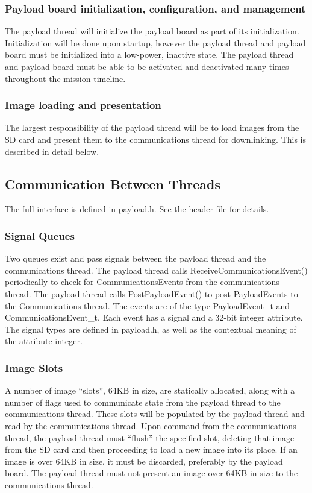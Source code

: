 \documentclass{article}
\begin{document}
\subsubsection{Payload board initialization, configuration, and management}
The payload thread will initialize the payload board as part of its initialization.
Initialization will be done upon startup, however the payload thread and payload
board must be initialized into a low-power, inactive state. The payload thread
and payload board must be able to be activated and deactivated many times
throughout the mission timeline.

\subsubsection{Image loading and presentation}
The largest responsibility of the payload thread will be to load images from 
the SD card and present them to the communications thread for downlinking. This
is described in detail below.

\subsection{Communication Between Threads}
The full interface is defined in payload.h. See the header file for details.
\subsubsection{Signal Queues}
Two queues exist and pass signals between the payload thread and the
communications thread. The payload thread calls ReceiveCommunicationsEvent()
periodically to check for CommunicationsEvents from the
communications thread. The payload thread calls PostPayloadEvent() to post 
PayloadEvents to the Communications thread. The events are of the type
PayloadEvent\_t and CommunicationsEvent\_t. Each event has a signal and a 32-bit
integer attribute. The signal types are defined in payload.h, as well as the
contextual meaning of the attribute integer.

\subsubsection{Image Slots}
A number of image ``slots'', 64KB in size, are statically allocated,
along with a number of flags  used to communicate state from the payload thread
to the communications thread. These slots will be
populated by the payload thread and read by the communications thread. Upon
command from the communications thread, the payload thread must ``flush'' the
specified slot, deleting that image from the SD card and then proceeding to
load a new image into its place. If an image is over 64KB in size, it must be
discarded, preferably by the payload board. The payload thread must not present
an image over 64KB in size to the communications thread.
\end{document}
